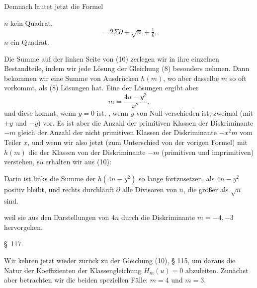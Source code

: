 Demnach lautet jetzt die Formel


$n$ kein Quadrat,
\[
= 2\Sigma\partial + \sqrt{n} + \tfrac{1}{6},
\]
$n$ ein Quadrat.

Die Summe auf der linken Seite von (10) zerlegen wir in ihre einzelnen Bestandteile, indem wir jede Lösung der Gleichung (8) besonders nehmen. Dann bekommen wir eine Summe von Ausdrücken $h(m)$, wo aber dasselbe $m$ so oft vorkommt, als (8) Lösungen hat. Eine der Lösungen ergibt aber
\[
m = \frac{4n-y^2}{x^2},
\]
und diese kommt, wenn $y=0$ ist, , wenn $y$ von Null verschieden ist, zweimal (mit $+y$ und $-y$) vor. Es ist aber die Anzahl der primitiven Klassen der Diskriminante $-m$ gleich der Anzahl der nicht primitiven Klassen der Diskriminante $-x^2m$ vom Teiler $x$, und wenn wir also jetzt (zum Unterschied von der vorigen Formel) mit $h(m)$ die  der Klassen von der Diskriminante $-m$ (primitiven und imprimitiven) verstehen, so erhalten wir aus (10):

Darin ist links die Summe der $h(4n-y^2)$ so lange fortzusetzen, als $4n-y^2$ positiv bleibt, und rechts durchläuft $\partial$ alle Divisoren von $n$, die größer als $\sqrt{n}$ sind.

 weil sie aus den Darstellungen von $4n$ durch die Diskriminante $m=-4,-3$ hervorgehen.

\begin{center}
\S\ 117. \textbf{}
\end{center}

Wir kehren jetzt wieder zurück zu der Gleichung (10), § 115, um daraus die Natur der Koeffizienten der Klassengleichung $H_m(u)=0$ abzuleiten. Zunächst aber betrachten wir die beiden speziellen Fälle: $m=4$ und $m=3$.
